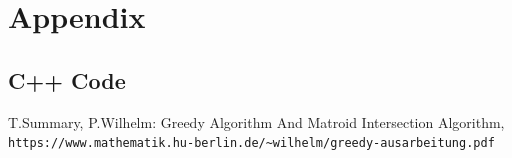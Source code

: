 \documentclass[10pt]{article}
\begin{document}
  \section*{Appendix}
  \subsection*{C++ Code}
  

\newpage  
 \begin{thebibliography}{9}
T.Summary, P.Wilhelm: Greedy Algorithm And
Matroid Intersection Algorithm,
\\\texttt{https://www.mathematik.hu-berlin.de/\~{}wilhelm/greedy-ausarbeitung.pdf}
\end{thebibliography}
 
\end{document}
